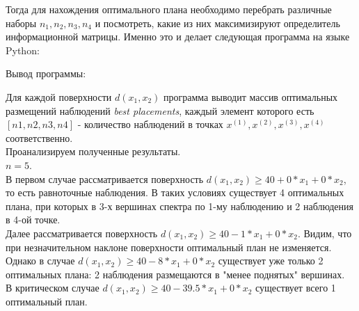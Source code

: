Тогда для нахождения оптимального плана необходимо перебрать различные наборы $n_1, n_2, n_3, n_4$ и посмотреть, какие из них максимизируют определитель информационной матрицы. Именно это и делает следующая программа на языке Python:



Вывод программы:



Для каждой поверхности $d(x_1, x_2)$ программа выводит массив оптимальных размещений наблюдений \textit{best placements}, каждый элемент которого есть $[n1, n2, n3, n4]$ -  количество наблюдений в точках $x^{(1)}, x^{(2)}, x^{(3)}, x^{(4)}$ соответственно.\\
Проанализируем полученные результаты.\\
$n = 5$.\\
В первом случае рассматривается поверхность $d(x_1, x_2) \ge 40 + 0*x_1 + 0*x_2$, то есть равноточные наблюдения. В таких условиях существует 4 оптимальных плана, при которых в 3-х вершинах спектра по 1-му наблюдению и 2 наблюдения в 4-ой точке. \\
Далее рассматривается поверхность $d(x_1, x_2) \ge 40 - 1*x_1 + 0*x_2$. Видим, что при незначительном наклоне поверхности оптимальный план не изменяется. \\
Однако в случае $d(x_1, x_2) \ge 40 - 8*x_1 + 0*x_2$ существует уже только 2 оптимальных плана: 2 наблюдения размещаются в "менее поднятых" вершинах.\\
В критическом случае $d(x_1, x_2) \ge 40 - 39.5*x_1 + 0*x_2$ существует всего 1 оптимальный план.